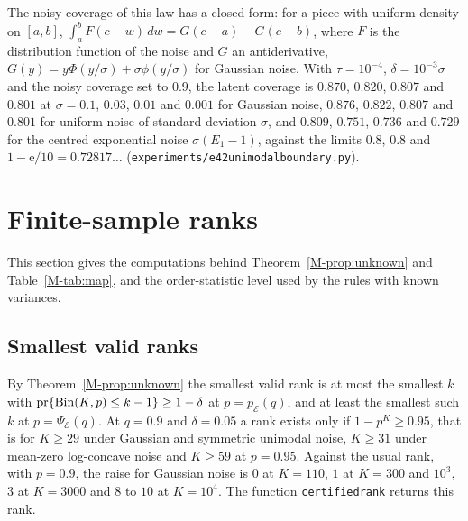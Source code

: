 \documentclass[11pt]{article}
\renewcommand{\_}{\usc\allowbreak}
\newcommand{\pr}{\mathrm{pr}}
\begin{document}
The noisy coverage of this law has a closed form: for a piece with uniform density on $[a, b]$, $\int_a^b F(c - w)\,dw = G(c - a) - G(c - b)$, where $F$ is the distribution function of the noise and $G$ an antiderivative, $G(y) = y\Phi(y/\sigma) + \sigma\phi(y/\sigma)$ for Gaussian noise. With $\tau = 10^{-4}$, $\delta = 10^{-3}\sigma$ and the noisy coverage set to $0.9$, the latent coverage is $0.870$, $0.820$, $0.807$ and $0.801$ at $\sigma = 0.1$, $0.03$, $0.01$ and $0.001$ for Gaussian noise, $0.876$, $0.822$, $0.807$ and $0.801$ for uniform noise of standard deviation $\sigma$, and $0.809$, $0.751$, $0.736$ and $0.729$ for the centred exponential noise $\sigma(E_1 - 1)$, against the limits $0.8$, $0.8$ and $1 - \mathrm{e}/10 = 0.72817\ldots$ (\texttt{experiments/e42\_unimodal\_boundary.py}).

\section{Finite-sample ranks}\label{sec:s-ranks}

This section gives the computations behind Theorem~\ref{M-prop:unknown} and Table~\ref{M-tab:map}, and the order-statistic level used by the rules with known variances.

\subsection*{Smallest valid ranks}

By Theorem~\ref{M-prop:unknown} the smallest valid rank is at most the smallest $k$ with $\pr\{{\rm Bin}(K, p) \le k - 1\} \ge 1 - \delta$ at $p = p_{\mathcal E}(q)$, and at least the smallest such $k$ at $p = \Psi_{\mathcal E}(q)$. At $q = 0.9$ and $\delta = 0.05$ a rank exists only if $1 - p^K \ge 0.95$, that is for $K \ge 29$ under Gaussian and symmetric unimodal noise, $K \ge 31$ under mean-zero log-concave noise and $K \ge 59$ at $p = 0.95$. Against the usual rank, with $p = 0.9$, the raise for Gaussian noise is $0$ at $K = 110$, $1$ at $K = 300$ and $10^3$, $3$ at $K = 3000$ and $8$ to $10$ at $K = 10^4$. The function \texttt{certified\_rank} returns this rank.
\end{document}
